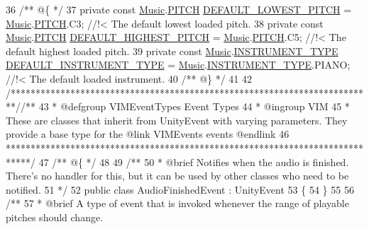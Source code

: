 \begin{DoxyCodeInclude}
36 \textcolor{comment}{    /** @\{ */}
37     \textcolor{keyword}{private} \textcolor{keyword}{const} \hyperlink{class_music}{Music}.\hyperlink{group___music_enums_ga508f69b199ea518f935486c990edac1d}{PITCH} \hyperlink{group___v_i_m_const_ga0ae09555ae6bc8a04110599510a0d77d}{DEFAULT\_LOWEST\_PITCH} = 
      \hyperlink{class_music}{Music}.\hyperlink{group___music_enums_ga508f69b199ea518f935486c990edac1d}{PITCH}.C3; \textcolor{comment}{//!< The default lowest loaded pitch.}
38 \textcolor{comment}{}    \textcolor{keyword}{private} \textcolor{keyword}{const} \hyperlink{class_music}{Music}.\hyperlink{group___music_enums_ga508f69b199ea518f935486c990edac1d}{PITCH} \hyperlink{group___v_i_m_const_gadb93993bf989a9ac6e95be9e1561a5bb}{DEFAULT\_HIGHEST\_PITCH} = 
      \hyperlink{class_music}{Music}.\hyperlink{group___music_enums_ga508f69b199ea518f935486c990edac1d}{PITCH}.C5; \textcolor{comment}{//!< The default highest loaded pitch.}
39 \textcolor{comment}{}    \textcolor{keyword}{private} \textcolor{keyword}{const} \hyperlink{class_music}{Music}.\hyperlink{group___music_enums_gabfce60192305965558a36e368ebd67c3}{INSTRUMENT\_TYPE} 
      \hyperlink{group___v_i_m_const_gad74e35b317d6cc0bb57a78117fa430e6}{DEFAULT\_INSTRUMENT\_TYPE} = \hyperlink{class_music}{Music}.\hyperlink{group___music_enums_gabfce60192305965558a36e368ebd67c3}{INSTRUMENT\_TYPE}.PIANO; \textcolor{comment}{//!< The
       default loaded instrument.}
40 \textcolor{comment}{}\textcolor{comment}{    /** @\} */}
41 
42     \textcolor{comment}{/*************************************************************************/}\textcolor{comment}{/** }
43 \textcolor{comment}{    * @defgroup VIMEventTypes Event Types}
44 \textcolor{comment}{    * @ingroup VIM}
45 \textcolor{comment}{    * These are classes that inherit from UnityEvent with varying parameters. They provide a base type for
       the @link VIMEvents events @endlink}
46 \textcolor{comment}{    *****************************************************************************/}\textcolor{comment}{}
47 \textcolor{comment}{    /** @\{ */}
48 \textcolor{comment}{}
49 \textcolor{comment}{    /**}
50 \textcolor{comment}{     * @brief Notifies when the audio is finished. There's no handler for this, but it can be used by other
       classes who need to be notified.}
51 \textcolor{comment}{    */}
52     \textcolor{keyword}{public} \textcolor{keyword}{class }AudioFinishedEvent : UnityEvent
53     \{
54     \}
55 \textcolor{comment}{}
56 \textcolor{comment}{    /**}
57 \textcolor{comment}{     * @brief A type of event that is invoked whenever the range of playable pitches should change. }

\end{DoxyCodeInclude}
